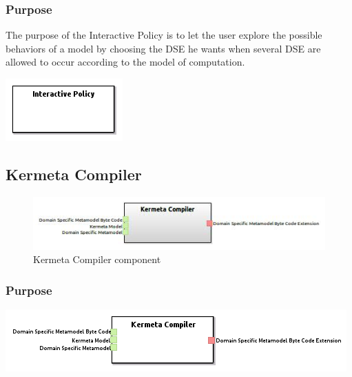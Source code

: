 \documentclass{gemoc} %
\begin{document}
\subsubsection{Purpose}
The purpose of the Interactive Policy is to let the user explore the possible behaviors of a model by choosing the DSE he wants when several DSE are allowed to occur according to the model of computation.
\begin{center}
\includegraphics*[trim=0.0cm 0.0cm 0cm 0.0cm, clip=true]{../images/generated/Generated_Interactive_Policy.png}
\end{center}



\subsection{Kermeta Compiler}

\begin{figure}[htp]
	\begin{center}
	\includegraphics*[trim=0.0cm 0.0cm 0cm 0.0cm, clip=true, scale=1.0]{../images/generated/Generated_Kermeta Compiler.jpg}
	\caption{Kermeta Compiler component}
	\end{center}
\end{figure}

\subsubsection{Purpose}

\begin{center}
\includegraphics*[trim=0.0cm 0.0cm 0cm 0.0cm, clip=true]{../images/generated/Generated_Kermeta_Compiler.png}
\end{center}
\end{document}
